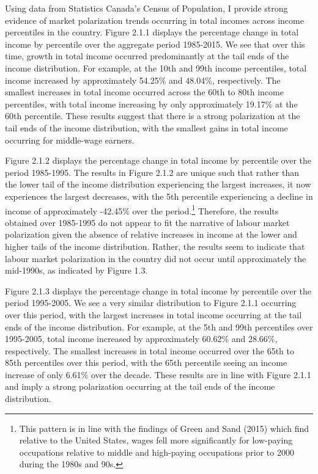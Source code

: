 \documentclass[undefended]{bumrp}
\begin{document}
Using data from Statistics Canada’s Census of Population, I provide strong evidence of market polarization trends occurring in total incomes across income percentiles in the country. Figure 2.1.1 displays the percentage change in total income by percentile over the aggregate period 1985-2015. We see that over this time, growth in total income occurred predominantly at the tail ends of the income distribution. For example, at the 10th and 99th income percentiles, total income increased by approximately 54.25\% and 48.04\%, respectively. The smallest increases in total income occurred across the 60th to 80th income percentiles, with total income increasing by only approximately 19.17\% at the 60th percentile. These results suggest that there is a strong polarization at the tail ends of the income distribution, with the smallest gains in total income occurring for middle-wage earners.

Figure 2.1.2 displays the percentage change in total income by percentile over the period 1985-1995. The results in Figure 2.1.2 are unique such that rather than the lower tail of the income distribution experiencing the largest increases, it now experiences the largest decreases, with the 5th percentile experiencing a decline in income of approximately -42.45\% over the period.\footnote{This pattern is in line with the findings of Green and Sand (2015) which find relative to the United States, wages fell more significantly for low-paying occupations relative to middle and high-paying occupations prior to 2000 during the 1980s and 90s.} Therefore, the results obtained over 1985-1995 do not appear to fit the narrative of labour market polarization given the absence of relative increases in income at the lower and higher tails of the income distribution. Rather, the results seem to indicate that labour market polarization in the country did not occur until approximately the mid-1990s, as indicated by Figure 1.3. 

Figure 2.1.3 displays the percentage change in total income by percentile over the period 1995-2005. We see a very similar distribution to Figure 2.1.1 occurring over this period, with the largest increases in total income occurring at the tail ends of the income distribution. For example, at the 5th and 99th percentiles over 1995-2005, total income increased by approximately 60.62\% and 28.66\%, respectively. The smallest increases in total income occurred over the 65th to 85th percentiles over this period, with the 65th percentile seeing an income increase of only 6.61\% over the decade. These results are in line with Figure 2.1.1 and imply a strong polarization occurring at the tail ends of the income distribution.
\end{document}
